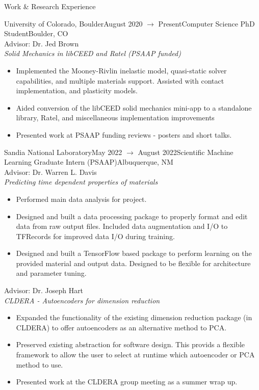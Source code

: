 \documentclass{resume} %
\begin{document}
\begin{rSection}{Work \& Research Experience}
\begin{rSubsection}{University of Colorado, Boulder}{August 2020 $\to$ Present}{Computer Science PhD Student}{Boulder, CO}\\
Advisor: Dr. Jed Brown\\
\textit{Solid Mechanics in libCEED and Ratel (PSAAP funded)}
\begin{itemize}
    \renewcommand\labelitemi{\textbullet}
    \setlength \itemsep{-0.4em}
    \item Implemented the Mooney-Rivlin inelastic model, quasi-static solver capabilities, and multiple materials support. Assisted with contact implementation, and plasticity models.
    \item Aided conversion of the libCEED solid mechanics mini-app to a standalone library, Ratel, and miscellaneous implementation improvements
    \item Presented work at PSAAP funding reviews - posters and short talks.
\end{itemize}
\end{rSubsection}

\begin{rSubsection}{Sandia National Laboratory}{May 2022 $\to$ August 2022}{Scientific Machine Learning Graduate Intern (PSAAP)}{Albuquerque, NM}\\
Advisor: Dr. Warren L. Davis\\
\textit{Predicting time dependent properties of materials}
\begin{itemize}
    \renewcommand\labelitemi{\textbullet}
    \setlength \itemsep{-0.4em}
	\item Performed main data analysis for project.
    \item Designed and built a data processing package to properly format and edit data from raw output files. Included data augmentation and I/O to TFRecords for improved data I/O during training.
	\item Designed and built a TensorFlow based package to perform learning on the provided material and output data. Designed to be flexible for architecture and parameter tuning.
\end{itemize}
Advisor: Dr. Joseph Hart\\
\textit{CLDERA - Autoencoders for dimension reduction}
\begin{itemize}
    \renewcommand\labelitemi{\textbullet}
    \setlength \itemsep{-0.4em}
    \item Expanded the functionality of the existing dimension reduction package (in CLDERA) to offer autoencoders as an alternative method to PCA.
	\item Preserved existing abstraction for software design. This provids a flexible framework to allow the user to select at runtime which autoencoder or PCA method to use.
	\item Presented work at the CLDERA group meeting as a summer wrap up.
\end{itemize}
\end{rSubsection}


\end{rSection}
\end{document}
